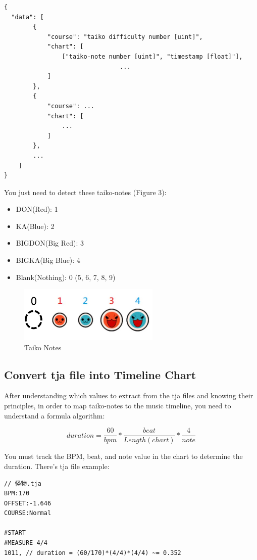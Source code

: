 \documentclass[a4paper,11pt, ctexart]{article}
\begin{document}
\begin{lstlisting}
{
  "data": [
        {
            "course": "taiko difficulty number [uint]",
            "chart": [
                ["taiko-note number [uint]", "timestamp [float]"], 
                                ...
            ]
        },
        {
            "course": ...
            "chart": [
                ...
            ]
        },
        ...
    ]
}
\end{lstlisting}


You just need to detect these taiko-notes (Figure 3):
\begin{itemize}
\item 
{
    DON(Red): 1 
}
\item 
{
    KA(Blue): 2
}
\item 
{
    BIGDON(Big Red): 3
}
\item 
{
    BIGKA(Big Blue): 4
}
\item 
{
    Blank(Nothing): 0 (5, 6, 7, 8, 9)
}

\end{itemize}

\begin{figure}[h]
    \centering
    \includegraphics[width=0.6\textwidth]{assets/taiko-note.jpg}
    \caption{Taiko Notes}
\end{figure}

\subsection{Convert tja file into Timeline Chart}
After understanding which values to extract from the tja files and knowing their principles, in order to map taiko-notes to the music timeline, you need to understand a formula algorithm:

$$ duration = \frac{60}{bpm} * \frac{beat}{Length(chart)} * \frac{4}{note} $$

You must track the BPM, beat, and note value in the chart to determine the duration. There's tja file example:

\begin{lstlisting}
// 怪物.tja
BPM:170
OFFSET:-1.646
COURSE:Normal

#START
#MEASURE 4/4
1011, // duration = (60/170)*(4/4)*(4/4) ~= 0.352
\end{lstlisting}
\end{document}
